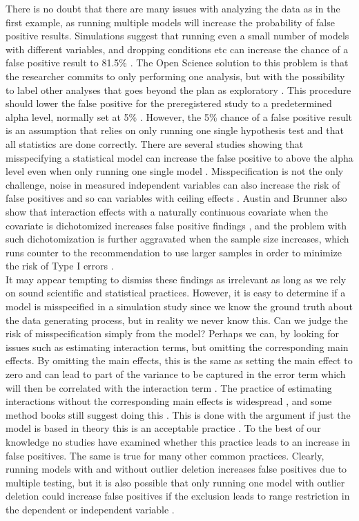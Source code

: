 There is no doubt that there are many issues with analyzing the data as in the first example, as running multiple models will increase the probability of false positive results. Simulations suggest that running even a small number of models with different variables, and dropping conditions  etc can increase the chance of a false positive result to 81.5\% \citep{Simmons2011}. The Open Science solution to this problem is that the researcher commits to only performing one analysis, but with the possibility to label other analyses that goes beyond the plan as exploratory \citep{Nosek2018}. This procedure should lower the false positive for the preregistered study to a predetermined alpha level, normally set at 5\% \citep{Moore2016}. However, the 5\% chance of a false positive result is an assumption that relies on only running one single hypothesis test and that all statistics are done correctly. There are several studies showing that misspecifying a  statistical model can increase the false positive to above the alpha level even when only running one single model \citep{Dennis2019,Litiere2007}. Misspecification is not the only challenge, noise in measured independent variables can also increase the risk of false positives \citep{Brunner2009} and so can variables with ceiling effects \citep{Austin2003}. Austin and Brunner also show that interaction effects with a naturally continuous covariate when the covariate is dichotomized increases false positive findings \citep{Austin2004}, and the problem with such dichotomization is further aggravated when the sample size increases, which runs counter to the recommendation to use larger samples in order to minimize the risk of Type I errors \citep{Simmons2011}. 
\\
It may appear tempting to dismiss these findings as irrelevant as long as we rely on sound scientific and statistical practices. However, it is easy to determine if a model is misspecified in a simulation study since we know the ground truth about the data generating process, but in reality we never know this. Can we judge the risk of misspecification simply from the model? Perhaps we can, by looking for issues such as estimating interaction terms, but omitting the corresponding main effects. By omitting the main effects, this is the same as setting the main effect to zero and can lead to part of the variance to be captured in the error term which will then be correlated with the interaction term \citep{Branbor2006}. The practice of estimating interactions without the corresponding main effects is widespread \citep{Branbor2006}, and some method books still suggest doing this \citep{Cleves2008}. This is done with the argument if just the model is based in theory this is an acceptable practice \citep{aiken1991multiple}. To the best of our knowledge no studies have examined whether this practice leads to an increase in false positives. The same is true for many other common practices. Clearly, running models with and without outlier deletion increases false positives due to multiple testing, but it is also possible that only running one model with outlier deletion could increase false positives if the exclusion leads to range restriction in the dependent or independent variable \citep{Raju2003}. \\        

